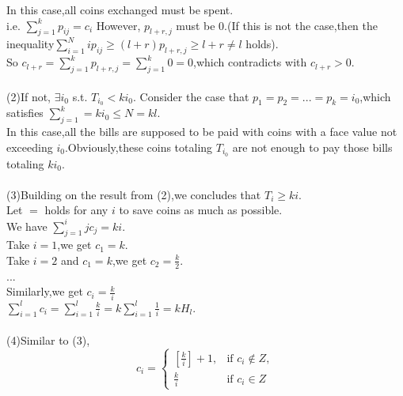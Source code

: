 \documentclass{article}
\begin{document}
In this case,all coins exchanged must be spent.\\
i.e. $\sum_{j=1}^kp_{ij}=c_i$
However, $p_{l+r,j}$ must be $0$.(If this is not the case,then the inequality$\sum_{i=1}^{N}ip_{ij}\geq (l+r)p_{l+r,j}\geq l+r\neq l$ holds).\\
So $c_{l+r}=\sum_{j=1}^k {p_{l+r,j}}=\sum_{j=1}^k 0 = 0$,which contradicts with $c_{l+r}>0$.\\
\\
(2)If not, $\exists i_0$ s.t. $T_{i_0}<ki_0$.
Consider the case that $p_1=p_2=...=p_k=i_0$,which satisfies $\sum_{j=1}^k=ki_0\leq N=kl$.\\
In this case,all the bills are supposed to be paid with coins with a face value not exceeding $i_0$.Obviously,these coins totaling $T_{i_0}$ are not enough to pay those bills totaling $ki_0$.\\
\\
(3)Building on the result from (2),we concludes that $T_i\geq ki$.\\
Let $=$ holds for any $i$ to save coins as much as possible.\\
We have $\sum_{j=1}^i jc_j=ki$.\\
Take $i=1$,we get $c_1=k$.\\
Take $i=2$ and $c_1=k$,we get $c_2 = \frac{k}{2}$.\\
...\\
Similarly,we get $c_i=\frac{k}{i}$\\
$\sum_{i=1}^lc_i=\sum_{i=1}^l \frac{k}{i}=k\sum_{i=1}^l\frac{1}{i}=kH_l$.\\
\\
(4)Similar to (3),\\
\[ c_i= \begin{cases} [\frac{k}{i}]+1, & \text{if } c_i \notin Z ,\\\frac{k}{i}  & \text{if } c_i \in Z \end{cases} \]
\end{document}
